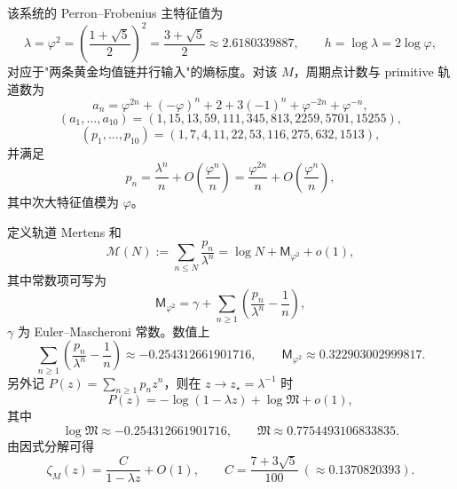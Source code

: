 该系统的 Perron--Frobenius 主特征值为
\[
\lambda=\varphi^2=\left(\frac{1+\sqrt5}{2}\right)^2=\frac{3+\sqrt5}{2}\approx 2.6180339887,
\qquad
h=\log\lambda=2\log\varphi,
\]
对应于"两条黄金均值链并行输入"的熵标度。对该 $M$，周期点计数与 primitive 轨道数为
\[
a_n=\varphi^{2n}+(-\varphi)^n+2+3(-1)^n+\varphi^{-2n}+\varphi^{-n},
\]
\[
(a_1,\dots,a_{10})=(1,15,13,59,111,345,813,2259,5701,15255),
\]
\[
(p_1,\dots,p_{10})=(1,7,4,11,22,53,116,275,632,1513),
\]
并满足
\[
p_n=\frac{\lambda^n}{n}+O\!\left(\frac{\varphi^n}{n}\right)
=\frac{\varphi^{2n}}{n}+O\!\left(\frac{\varphi^n}{n}\right),
\]
其中次大特征值模为 $\varphi$。

定义轨道 Mertens 和
\[
\mathcal{M}(N):=\sum_{n\le N}\frac{p_n}{\lambda^n}
=\log N+\mathsf{M}_{\varphi^2}+o(1),
\]
其中常数项可写为
\[
\mathsf{M}_{\varphi^2}
=\gamma+\sum_{n\ge 1}\left(\frac{p_n}{\lambda^n}-\frac{1}{n}\right),
\]
$\gamma$ 为 Euler--Mascheroni 常数。数值上
\[
\sum_{n\ge 1}\left(\frac{p_n}{\lambda^n}-\frac{1}{n}\right)\approx -0.254312661901716,
\qquad
\mathsf{M}_{\varphi^2}\approx 0.322903002999817.
\]
另外记 $P(z)=\sum_{n\ge 1}p_n z^n$，则在 $z\to z_\star=\lambda^{-1}$ 时
\[
P(z)=-\log(1-\lambda z)+\log\mathfrak{M}+o(1),
\]
其中
\[
\log\mathfrak{M}\approx -0.254312661901716,\qquad
\mathfrak{M}\approx 0.7754493106833835.
\]
由因式分解可得
\[
\zeta_M(z)=\frac{C}{1-\lambda z}+O(1),\qquad
C=\frac{7+3\sqrt5}{100}\ (\approx 0.1370820393).
\]

